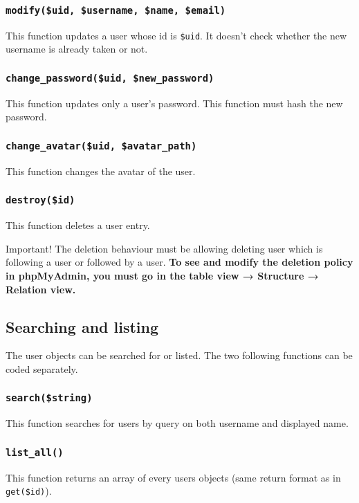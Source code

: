 \documentclass[twoside,a4paper,12pt]{article}
\begin{document}
\subsubsection{\texttt{modify(\$uid, \$username, \$name, \$email)}}
This function updates a user whose id is \texttt{\$uid}. It doesn't check whether the new username is already taken or not.


\subsubsection{\texttt{change\_password(\$uid, \$new\_password)}}
This function updates only a user's password. This function must hash the new password.

\subsubsection{\texttt{change\_avatar(\$uid, \$avatar\_path)}}
This function changes the avatar of the user.

\subsubsection{\texttt{destroy(\$id)}}
This function deletes a user entry.

\begin{bclogo}[logo=\bcattention, noborder=true, barre=none]{Important!}
	The deletion behaviour must be allowing deleting user which is following a user or followed by a user. \textbf{To see and modify the deletion policy in phpMyAdmin, you must go in the table view → Structure → Relation view.}
		
\end{bclogo}

\subsection{Searching and listing}
The user objects can be searched for or listed. The two following functions can be coded separately.

\subsubsection{\texttt{search(\$string)}}
This function searches for users by query on both username and displayed name.

\subsubsection{\texttt{list\_all()}}
This function returns an array of every users objects (same return format as in \texttt{get(\$id)}).
\end{document}
